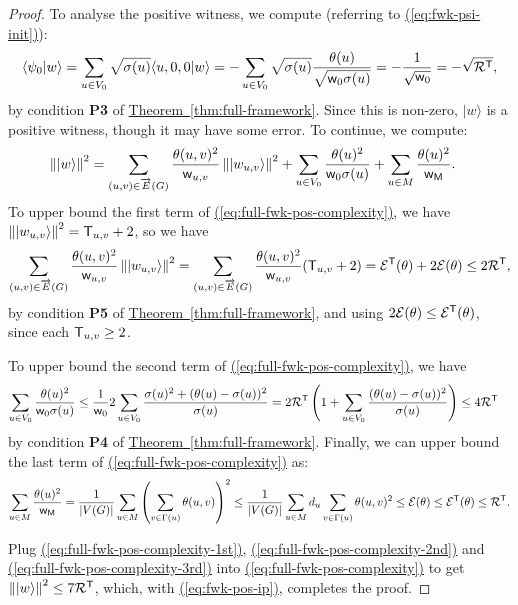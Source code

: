\documentclass{theoretics}
\newcommand{\eq}[1]{\hyperref[eq:#1]{(\ref*{eq:#1})}}
\newcommand{\thm}[1]{\hyperref[thm:#1]{Theorem~\ref*{thm:#1}}}
\def\ket#1{{\lvert}#1\rangle}
\renewcommand{\>}{\rangle}
\newcommand{\<}{\langle}
\renewcommand{\(}{\left(}
\renewcommand{\)}{\right)}
\def\braket#1#2{{{\langle}#1\vert}#2\rangle}
\def\norm#1{\left\| #1 \right\|}
\def\w{{\sf w}}
\begin{document}
\begin{proof}
To analyse the positive witness, we compute (referring to \eq{fwk-psi-init}): 
\begin{align}
\braket{\psi_0}{w}=\sum_{u\in V_0}\sqrt{\sigma(u)}\braket{u,0,0}{w} = -\sum_{u\in V_0}\sqrt{\sigma(u)}\frac{\theta(u)}{\sqrt{\w_0\sigma(u)}}=-\frac{1}{\sqrt{\w_0}} = -\sqrt{{\cal R}^{\sf T}},\label{eq:fwk-pos-ip}
\end{align}
by condition \textbf{P3} of \thm{full-framework}.
Since this is non-zero, $\ket{w}$ is a positive witness, though it may have some error. To continue, we compute:
\begin{align}
\norm{\ket{w}}^2 &=\sum_{(u,v)\in \overrightarrow{E}(G)}\frac{\theta(u,v)^2}{\w_{u,v}}\norm{\ket{w_{u,v}}}^2+\sum_{u\in{V_0}}\frac{\theta(u)^2}{\w_0\sigma(u)}+\sum_{u\in M}\frac{\theta(u)^2}{\w_{\sf M}}.\label{eq:full-fwk-pos-complexity}
\end{align}
To upper bound the first term of \eq{full-fwk-pos-complexity}, we have $\norm{\ket{w_{u,v}}}^2={\sf T}_{u,v}+2$, so we have
\begin{align}
\sum_{(u,v)\in\overrightarrow{E}(G)}\frac{\theta(u,v)^2}{\w_{u,v}}\norm{\ket{w_{u,v}}}^2 = \sum_{(u,v)\in\overrightarrow{E}(G)}\frac{\theta(u,v)^2}{\w_{u,v}}({\sf T}_{u,v}+2)={\cal E}^{\sf T}(\theta)+2{\cal E}(\theta)\leq 2{\cal R}^{\sf T},\label{eq:full-fwk-pos-complexity-1st}
\end{align}
by condition \textbf{P5} of \thm{full-framework}, and using $2{\cal E}(\theta)\leq {\cal E}^{\sf T}(\theta)$, since each ${\sf T}_{u,v}\geq 2$. 

\noindent To upper bound the second term of \eq{full-fwk-pos-complexity}, we have
\begin{equation}
\begin{split}
\sum_{u\in{V_0}}\frac{\theta(u)^2}{\w_0\sigma(u)} & \leq \frac{1}{\w_0}2\sum_{u\in V_0}\frac{\sigma(u)^2+(\theta(u)-\sigma(u))^2}{\sigma(u)}=
2{\cal R}^{\sf T}\left(1+\sum_{u\in V_0}\frac{(\theta(u)-\sigma(u))^2}{\sigma(u)}\right)
\leq 4{\cal R}^{\sf T}
\end{split}\label{eq:full-fwk-pos-complexity-2nd}
\end{equation}
by condition \textbf{P4} of \thm{full-framework}. 
Finally, we can upper bound the last term of \eq{full-fwk-pos-complexity} as:
\begin{equation}
\sum_{u\in M}\frac{\theta(u)^2}{\w_{\sf M}} = \frac{1}{|V(G)|}\sum_{u\in M}\left(\sum_{v\in \Gamma(u)}\theta(u,v)\right)^2 
\leq \frac{1}{|V(G)|}\sum_{u\in M}d_u\sum_{v\in \Gamma(u)}\theta(u,v)^2
\leq {\cal E}(\theta)\leq {\cal E}^{\sf T}(\theta)\leq {\cal R}^{\sf T}.\label{eq:full-fwk-pos-complexity-3rd}
\end{equation}

\noindent Plug \eq{full-fwk-pos-complexity-1st}, \eq{full-fwk-pos-complexity-2nd} and \eq{full-fwk-pos-complexity-3rd} into \eq{full-fwk-pos-complexity} to get 
$\norm{\ket{w}}^2 \leq 7{\cal R}^{\sf T}$, which, with \eq{fwk-pos-ip}, completes the proof.
\end{proof}
\end{document}
